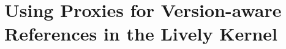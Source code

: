 \section{Using Proxies for Version-aware References in the Lively Kernel} \label{sec:APPROACH:2}










































